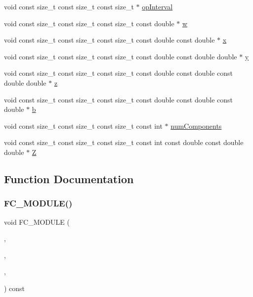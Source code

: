 \begin{DoxyCompactItemize}
\item 
void const size\+\_\+t const size\+\_\+t const size\+\_\+t $\ast$ \hyperlink{SimpleKernels_8H_ad3376da8cc0376fa774bdc40b28a61ca}{op\+Interval}
\item 
void const size\+\_\+t const size\+\_\+t const size\+\_\+t const double $\ast$ \hyperlink{SimpleKernels_8H_a953d166eae3bf40a9a6377b7345da431}{w}
\item 
void const size\+\_\+t const size\+\_\+t const size\+\_\+t const double const double $\ast$ \hyperlink{SimpleKernels_8H_a34a9d6580636e964d3fd783cbf72201b}{x}
\item 
void const size\+\_\+t const size\+\_\+t const size\+\_\+t const double const double double $\ast$ \hyperlink{SimpleKernels_8H_adbbc84da22c830df0837e7f82eff48d8}{y}
\item 
void const size\+\_\+t const size\+\_\+t const size\+\_\+t const double const double const double double $\ast$ \hyperlink{SimpleKernels_8H_adb2aee3e07debafe3268a02ecabbd911}{z}
\item 
void const size\+\_\+t const size\+\_\+t const size\+\_\+t const double const double const double $\ast$ \hyperlink{SimpleKernels_8H_a65e9556c06854351eb006cb2a38d1aa8}{b}
\item 
void const size\+\_\+t const size\+\_\+t const size\+\_\+t const int $\ast$ \hyperlink{SimpleKernels_8H_abb39988074870d597c8d1cfcf61514ee}{num\+Components}
\item 
void const size\+\_\+t const size\+\_\+t const size\+\_\+t const int const double const double double $\ast$ \hyperlink{SimpleKernels_8H_a410f84f11232fb55b68c2948b8caf50b}{Z}
\end{DoxyCompactItemize}


\subsection{Function Documentation}
\hypertarget{SimpleKernels_8H_a22078e2748198ace446a2e93e6c16ebe}{}\label{SimpleKernels_8H_a22078e2748198ace446a2e93e6c16ebe} 
\subsubsection{\texorpdfstring{F\+C\+\_\+\+M\+O\+D\+U\+L\+E()}{FC\_MODULE()}\hspace{0.1cm}{\footnotesize\ttfamily [1/26]}}
{\footnotesize\ttfamily void F\+C\+\_\+\+M\+O\+D\+U\+LE (\begin{DoxyParamCaption}\item[{simple}]{,  }\item[{yavdotwpy}]{,  }\item[{S\+I\+M\+P\+LE}]{,  }\item[{Y\+A\+V\+D\+O\+T\+W\+PY}]{ }\end{DoxyParamCaption}) const}

